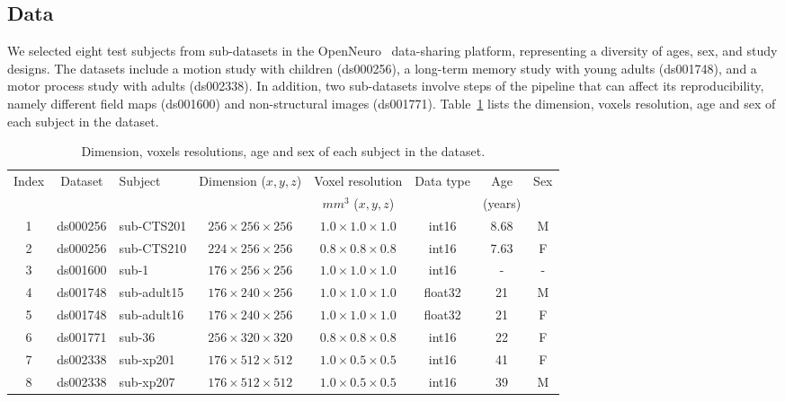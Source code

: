 \documentclass[lettersize,journal]{IEEEtran}
\begin{document}
\subsection{Data}\label{subsec:data}

We selected eight test subjects from sub-datasets in the OpenNeuro~\cite{markiewicz2021openneuro} data-sharing platform, representing a diversity of ages, sex, and study designs. The datasets include a motion study with children (ds000256), a long-term memory study with young adults (ds001748), and a motor process study with adults (ds002338). In addition, two sub-datasets involve steps of the pipeline that can affect its reproducibility, namely different field maps (ds001600) and non-structural images (ds001771). Table~\ref{table:dataset_info} lists the dimension, voxels resolution, age and sex of each subject in the dataset.

\begin{table}
    \begin{center}
        \begin{tabular}{c|c|l|c|c|c|c|c}
            Index & Dataset  & Subject     & Dimension ($x,y,z$)         & Voxel resolution            & Data type & Age     & Sex \\
                  &          &             &                             & $mm^3$ ($x,y,z$)            &           & (years) &     \\
            \hline
            1     & ds000256 & sub-CTS201  & $256 \times 256 \times 256$ & $1.0 \times 1.0 \times 1.0$ & int16     & 8.68    & M   \\
            2     & ds000256 & sub-CTS210  & $224 \times 256 \times 256$ & $0.8 \times 0.8 \times 0.8$ & int16     & 7.63    & F   \\
            3     & ds001600 & sub-1       & $176 \times 256 \times 256$ & $1.0 \times 1.0 \times 1.0$ & int16     & -       & -   \\
            4     & ds001748 & sub-adult15 & $176 \times 240 \times 256$ & $1.0 \times 1.0 \times 1.0$ & float32   & 21      & M   \\
            5     & ds001748 & sub-adult16 & $176 \times 240 \times 256$ & $1.0 \times 1.0 \times 1.0$ & float32   & 21      & F   \\
            6     & ds001771 & sub-36      & $256 \times 320 \times 320$ & $0.8 \times 0.8 \times 0.8$ & int16     & 22      & F   \\
            7     & ds002338 & sub-xp201   & $176 \times 512 \times 512$ & $1.0 \times 0.5 \times 0.5$ & int16     & 41      & F   \\
            8     & ds002338 & sub-xp207   & $176 \times 512 \times 512$ & $1.0 \times 0.5 \times 0.5$ & int16     & 39      & M   \\
        \end{tabular}
    \end{center}
    \caption{Dimension, voxels resolutions, age and sex of each subject in the dataset.}
    \label{table:dataset_info}
\end{table}
\end{document}
